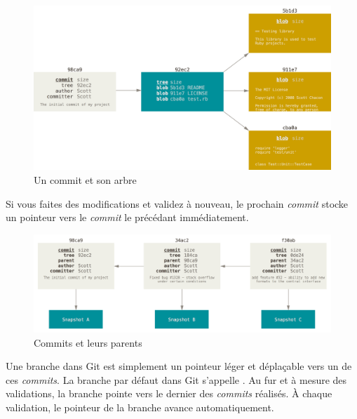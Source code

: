 \begin{figure}[H]
  \centering
  \includegraphics{images/commit-and-tree}
  \caption{Un commit et son arbre}
  \label{fig:git:commit-and-tree}
\end{figure}

Si vous faites des modifications et validez à nouveau, le prochain \emph{commit} stocke un pointeur vers le \emph{commit} le précédant immédiatement.

\begin{figure}[H]
  \centering
  \includegraphics{images/commits-and-parents}
  \caption{Commits et leurs parents}
  \label{fig:git:commits-and-parents}
\end{figure}

Une branche dans Git est simplement un pointeur léger et déplaçable vers un de ces \emph{commits}.
La branche par défaut dans Git s'appelle .
Au fur et à mesure des validations, la branche  pointe vers le dernier des \emph{commits} réalisés.
À chaque validation, le pointeur de la branche  avance automatiquement.


